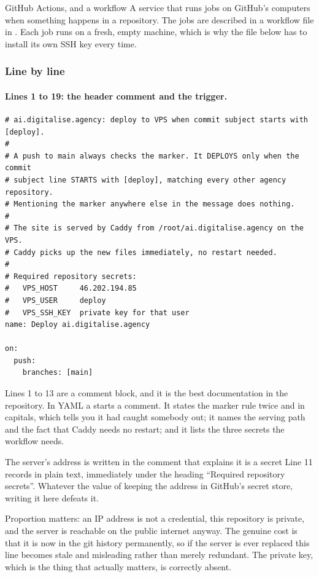 \begin{jargon}{GitHub Actions, and a workflow}
A service that runs jobs on GitHub's computers when something happens in a
repository. The jobs are described in a workflow file in
. Each job runs on a fresh, empty machine, which is why
the file below has to install its own SSH key every time.
\end{jargon}

\subsubsection*{Line by line}

\paragraph{Lines 1 to 19: the header comment and the trigger.}

\begin{lstlisting}[firstnumber=1,caption={\file{deploy.yml.disabled}, lines 1--19}]
# ai.digitalise.agency: deploy to VPS when commit subject starts with [deploy].
#
# A push to main always checks the marker. It DEPLOYS only when the commit
# subject line STARTS with [deploy], matching every other agency repository.
# Mentioning the marker anywhere else in the message does nothing.
#
# The site is served by Caddy from /root/ai.digitalise.agency on the VPS.
# Caddy picks up the new files immediately, no restart needed.
#
# Required repository secrets:
#   VPS_HOST     46.202.194.85
#   VPS_USER     deploy
#   VPS_SSH_KEY  private key for that user
name: Deploy ai.digitalise.agency

on:
  push:
    branches: [main]
\end{lstlisting}

Lines 1 to 13 are a comment block, and it is the best documentation in the
repository. In YAML a \code{\#} starts a comment. It states the marker rule twice
and in capitals, which tells you it had caught somebody out; it names the serving
path and the fact that Caddy needs no restart; and it lists the three secrets the
workflow needs.

\begin{honest}{The server's address is written in the comment that explains it is
a secret}
Line 11 records  in plain text, immediately under the
heading ``Required repository secrets''. Whatever the value of keeping the address
in GitHub's secret store, writing it here defeats it.

Proportion matters: an IP address is not a credential, this repository is private,
and the server is reachable on the public internet anyway. The genuine cost is that
it is now in the git history permanently, so if the server is ever replaced this
line becomes stale and misleading rather than merely redundant. The private key,
which is the thing that actually matters, is correctly absent.
\end{honest}

